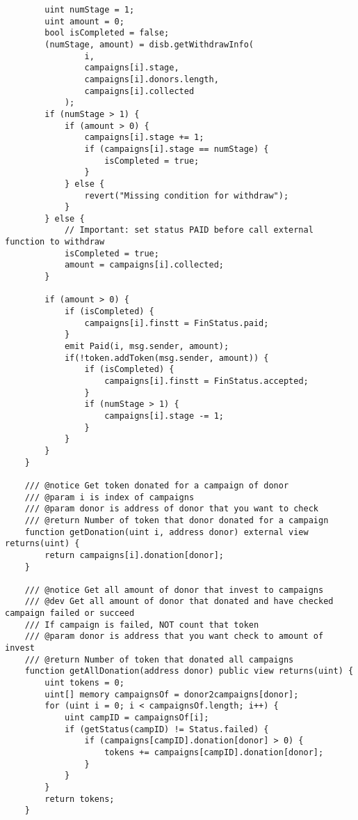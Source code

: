\documentclass[../main-report.tex]{subfiles}
\begin{document}
\begin{lstlisting}
        uint numStage = 1;
        uint amount = 0;
        bool isCompleted = false;
        (numStage, amount) = disb.getWithdrawInfo(
                i,
                campaigns[i].stage,
                campaigns[i].donors.length,
                campaigns[i].collected
            );
        if (numStage > 1) {
            if (amount > 0) {
                campaigns[i].stage += 1;
                if (campaigns[i].stage == numStage) {
                    isCompleted = true;
                }
            } else {
                revert("Missing condition for withdraw");
            }
        } else {
            // Important: set status PAID before call external function to withdraw
            isCompleted = true;
            amount = campaigns[i].collected;
        }

        if (amount > 0) {
            if (isCompleted) {
                campaigns[i].finstt = FinStatus.paid;
            }
            emit Paid(i, msg.sender, amount);
            if(!token.addToken(msg.sender, amount)) {
                if (isCompleted) {
                    campaigns[i].finstt = FinStatus.accepted;
                }
                if (numStage > 1) {
                    campaigns[i].stage -= 1;
                }
            }
        }
    }

    /// @notice Get token donated for a campaign of donor
    /// @param i is index of campaigns
    /// @param donor is address of donor that you want to check
    /// @return Number of token that donor donated for a campaign
    function getDonation(uint i, address donor) external view returns(uint) {
        return campaigns[i].donation[donor];
    }

    /// @notice Get all amount of donor that invest to campaigns
    /// @dev Get all amount of donor that donated and have checked campaign failed or succeed
    /// If campaign is failed, NOT count that token
    /// @param donor is address that you want check to amount of invest
    /// @return Number of token that donated all campaigns
    function getAllDonation(address donor) public view returns(uint) {
        uint tokens = 0;
        uint[] memory campaignsOf = donor2campaigns[donor];
        for (uint i = 0; i < campaignsOf.length; i++) {
            uint campID = campaignsOf[i];
            if (getStatus(campID) != Status.failed) {
                if (campaigns[campID].donation[donor] > 0) {
                    tokens += campaigns[campID].donation[donor];
                }
            }
        }
        return tokens;
    }


\end{lstlisting}
\end{document}
